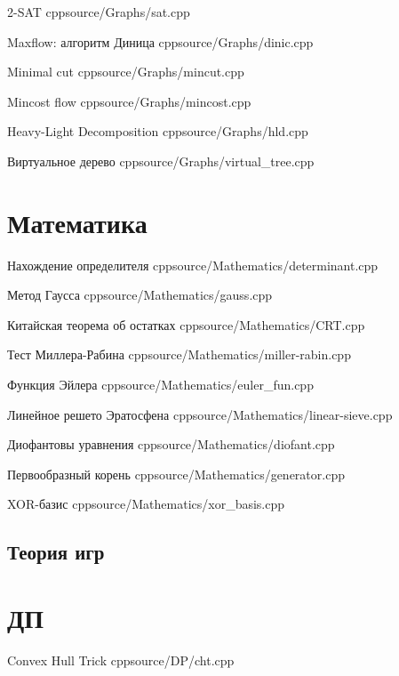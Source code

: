 \documentclass[landscape, 9pt, a4paper, oneside, twocolumn]{extarticle}
\begin{document}
\Algorithm
{2-SAT}
{}
{}
{cpp}{source/Graphs/sat.cpp}
{}

\Algorithm
{Maxflow: алгоритм Диница}
{}
{}
{cpp}{source/Graphs/dinic.cpp}
{}

\Algorithm
{Minimal cut}
{}
{}
{cpp}{source/Graphs/mincut.cpp}
{}

\Algorithm
{Mincost flow}
{}
{}
{cpp}{source/Graphs/mincost.cpp}
{}

\Algorithm
{Heavy-Light Decomposition}
{}
{}
{cpp}{source/Graphs/hld.cpp}
{}

\Algorithm
{Виртуальное дерево}
{}
{}
{cpp}{source/Graphs/virtual_tree.cpp}
{}

\section{Математика}




\Algorithm
{Нахождение определителя}
{}
{}
{cpp}{source/Mathematics/determinant.cpp}
{}

\Algorithm
{Метод Гаусса}
{}
{}
{cpp}{source/Mathematics/gauss.cpp}
{}

\Algorithm
{Китайская теорема об остатках}
{}
{}
{cpp}{source/Mathematics/CRT.cpp}
{}

\Algorithm
{Тест Миллера-Рабина}
{}
{}
{cpp}{source/Mathematics/miller-rabin.cpp}
{}

\Algorithm
{Функция Эйлера}
{}
{}
{cpp}{source/Mathematics/euler_fun.cpp}
{}

\Algorithm
{Линейное решето Эратосфена}
{}
{}
{cpp}{source/Mathematics/linear-sieve.cpp}
{}

\Algorithm
{Диофантовы уравнения}
{}
{}
{cpp}{source/Mathematics/diofant.cpp}
{}

\Algorithm
{Первообразный корень}
{}
{}
{cpp}{source/Mathematics/generator.cpp}
{}

\Algorithm
{XOR-базис}
{}
{}
{cpp}{source/Mathematics/xor_basis.cpp}
{}

\subsection {Теория игр}


\section{ДП}
\Algorithm
{Convex Hull Trick}
{}
{}
{cpp}{source/DP/cht.cpp}
{}
\end{document}
